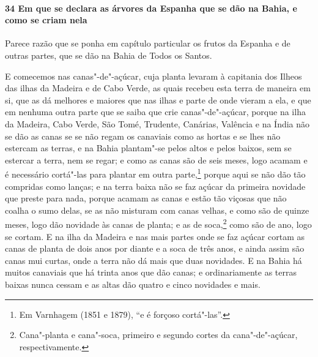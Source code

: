 \begin{linenumbers}
\paragraph{34 Em que se declara as árvores da Espanha que se dão na Bahia, e como se criam
nela}\quad
Parece razão que se ponha em capítulo particular os frutos da Espanha e de outras partes,
que se dão na Bahia de Todos os Santos.

E comecemos nas canas"-de"-açúcar, cuja planta levaram à capitania dos Ilheos das ilhas da
Madeira e de Cabo Verde, as quais recebeu esta terra de maneira em si, que as dá melhores
e maiores que nas ilhas e parte de onde vieram a ela, e que em nenhuma outra parte que se
saiba que crie canas"-de"-açúcar, porque na ilha da Madeira, Cabo Verde, São Tomé, Trudente,
Canárias, Valência e na Índia não se dão as canas se se não regam os canaviais como as
hortas e se lhes não estercam as terras, e na Bahia plantam"-se pelos altos e pelos baixos,
sem se estercar a terra, nem se regar; e como as canas são de seis meses, logo acamam e é
necessário cortá"-las para plantar em outra parte,\footnote{ Em Varnhagem (1851 e 1879),
``e é forçoso cortá"-las''.} porque aqui se não dão tão compridas como lanças; e na terra
baixa não se faz açúcar da primeira novidade que preste para nada, porque acamam as canas
e estão tão viçosas que não coalha o sumo delas, se as não misturam com canas velhas, e
como são de quinze meses, logo dão novidade às canas de planta; e as de soca,\footnote{
Cana"-planta e cana"-soca, primeiro e segundo cortes da cana"-de"-açúcar, respectivamente.}
como são de ano, logo se cortam. E na ilha da Madeira e nas mais partes onde se faz açúcar
cortam as canas de planta de dois anos por diante e a soca de três anos, e ainda assim são
canas mui curtas, onde a terra não dá mais que duas novidades. E na Bahia há muitos
canaviais que há trinta anos que dão canas; e ordinariamente as terras baixas nunca cessam
e as altas dão quatro e cinco novidades e mais.


\end{linenumbers}
